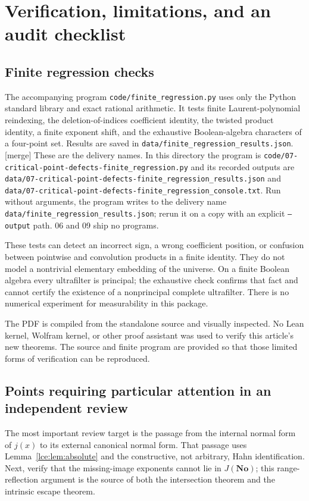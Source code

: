 \documentclass[11pt,letterpaper]{article}
\numberwithin{equation}{section}
\theoremstyle{definition}
\theoremstyle{remark}
\newcommand{\No}{\mathbf{No}}
\newcommand{\leref}[1]{Lemma~\ref{#1}}
\newcommand{\mergetag}{\textup{\textsf{\small[merge]}}}%
\begin{document}
\section{Verification, limitations, and an audit checklist}\label{lce:app:verification}

\subsection{Finite regression checks}
The accompanying program \texttt{code/finite\_regression.py} uses only the
Python standard library and exact rational arithmetic. It tests finite
Laurent-polynomial reindexing, the deletion-of-indices coefficient identity,
the twisted product identity, a finite exponent shift, and the exhaustive
Boolean-algebra characters of a four-point set. Results are saved in
\texttt{data/finite\_regression\_results.json}. \mergetag{} These are the
delivery names. In this directory the program is
\texttt{code/07-critical-point-defects-finite\_regression.py} and its recorded
outputs are
\texttt{data/07-critical-point-defects-finite\_regression\_results.json} and
\texttt{data/07-critical-point-defects-finite\_regression\_console.txt}. Run
without arguments, the program writes to the delivery name
\texttt{data/finite\_regression\_results.json}; rerun it on a copy with an
explicit \texttt{--output} path. 06 and 09 ship no programs.

These tests can detect an incorrect sign, a wrong coefficient position,
or confusion between pointwise and convolution products in a finite
identity. They do not model a nontrivial elementary embedding of the
universe. On a finite Boolean algebra every ultrafilter is principal;
the exhaustive check confirms that fact and cannot certify the existence
of a nonprincipal complete ultrafilter. There is no numerical experiment
for measurability in this package.

The PDF is compiled from the standalone source and visually inspected.
No Lean kernel, Wolfram kernel, or other proof assistant was used to
verify this article's new theorems. The source and finite program are
provided so that those limited forms of verification can be reproduced.

\subsection{Points requiring particular attention in an independent review}
The most important review target is the passage from the internal normal
form of $j(x)$ to its external canonical normal form. That passage uses
\leref{lce:lem:absolute} and the constructive, not arbitrary, Hahn
identification. Next, verify that the missing-image exponents cannot lie
in $J(\No)$; this range-reflection argument is the source of both the
intersection theorem and the intrinsic escape theorem.
\end{document}
